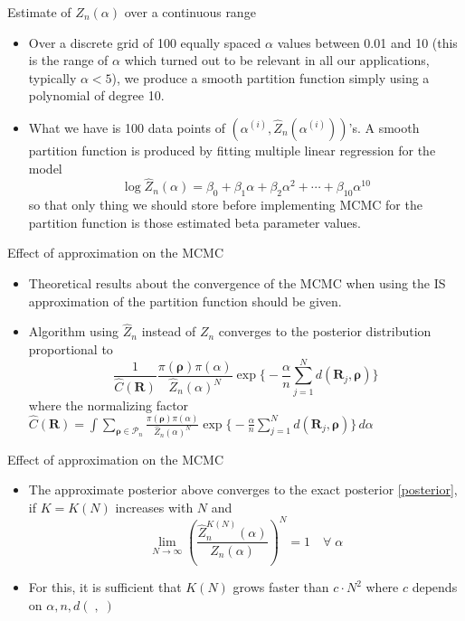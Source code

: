 \documentclass[11pt]{beamer}
\begin{document}
\begin{frame}{Estimate of $Z_n(\alpha)$ over a continuous range}
\begin{itemize}
    \item Over a discrete grid of 100 equally spaced $\alpha$ values between 0.01 and 10 (this is the range of $\alpha$ which turned out to be relevant in all our applications, typically $\alpha<5$), we produce a smooth partition function simply using a polynomial of degree 10.
    \item What we have is 100 data points of $(\alpha^{(i)}, \hat Z_n(\alpha^{(i)}))$'s. A smooth partition function is produced by fitting multiple linear regression for the model $$\log \hat Z_n(\alpha)=\beta_0+\beta_1 \alpha+\beta_2 \alpha^2+\cdots+\beta_{10} \alpha^{10}$$ so that only thing we should store before implementing MCMC for the partition function is those estimated beta parameter values.
\end{itemize}
\end{frame}

\begin{frame}{Effect of approximation on the MCMC}
\begin{itemize}
    \item Theoretical results about the convergence of the MCMC when using the IS approximation of the partition function should be given. 
    \item Algorithm using $\hat{Z}_n$ instead of $Z_n$ converges to the posterior distribution proportional to \begin{equation*} \frac{1}{\hat{C}(\mathbf{R})}\frac{\pi(\boldsymbol{\rho})\pi(\alpha)}{\hat{Z}_n(\alpha)^N} \exp \big\{-\frac{\alpha}{n}\sum_{j=1}^N d(\mathbf{R}_j, \boldsymbol{\rho})\big\} \end{equation*} where the normalizing factor $\hat{C}(\mathbf{R})=\int\sum_{\boldsymbol{\rho}\in \mathcal{P}_n}\frac{\pi(\boldsymbol{\rho})\pi(\alpha)}{\hat{Z}_n(\alpha)^N} \exp \big\{-\frac{\alpha}{n}\sum_{j=1}^N d(\mathbf{R}_j, \boldsymbol{\rho})\big\}\, d\alpha $
\end{itemize}
\end{frame}

\begin{frame}{Effect of approximation on the MCMC}
    \begin{itemize}
        \item The approximate posterior above converges to the exact posterior \eqref{posterior}, if $K=K(N)$ increases with $N$ and $$\lim_{N \to \infty}(\frac{\hat{Z}_n^{K(N)}(\alpha)}{Z_n(\alpha)})^N =1 \quad \forall \; \alpha$$
        \item For this, it is sufficient that $K(N)$ grows faster than $c\cdot N^2$ where $c$ depends on $\alpha, n, d( \;,\; )$ 
    \end{itemize}
    \end{frame}
\end{document}
